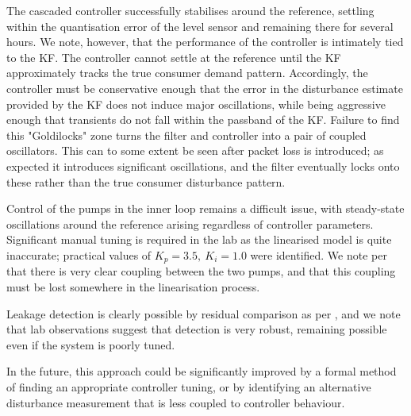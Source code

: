 The cascaded controller successfully stabilises around the reference, settling within the quantisation error of the level sensor and remaining there for several hours. We note, however, that the performance of the controller is intimately tied to the KF. The controller cannot settle at the reference until the KF approximately tracks the true consumer demand pattern. Accordingly, the controller must be conservative enough that the error in the disturbance estimate provided by the KF does not induce major oscillations, while being aggressive enough that transients do not fall within the passband of the KF. Failure to find this "Goldilocks" zone turns the filter and controller into a pair of coupled oscillators. This can to some extent be seen after packet loss is introduced; as expected it introduces significant oscillations, and the filter eventually locks onto these rather than the true consumer disturbance pattern.

Control of the pumps in the inner loop remains a difficult issue, with steady-state oscillations around the reference arising regardless of controller parameters. Significant manual tuning is required in the lab as the linearised model is quite inaccurate; practical values of $K_p = 3.5, \ K_i = 1.0$ were identified. We note per  that there is very clear coupling between the two pumps, and that this coupling must be lost somewhere in the linearisation process. 

Leakage detection is clearly possible by residual comparison as per , and we note that lab observations suggest that detection is very robust, remaining possible even if the system is poorly tuned.

In the future, this approach could be significantly improved by a formal method of finding an appropriate controller tuning, or by identifying an alternative disturbance measurement that is less coupled to controller behaviour.